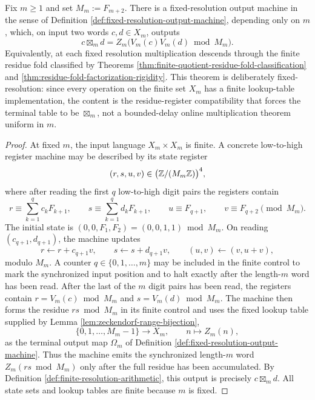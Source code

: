 \begin{theorem}\label{thm:finite-mul-fixed-resolution-fst}
Fix \(m\ge 1\) and set \(M_m:=F_{m+2}\). There is a fixed-resolution output machine in the sense of Definition \ref{def:fixed-resolution-output-machine}, depending only on \(m\), which, on input two words \(c,d\in X_m\), outputs
\[
c\boxtimes_m d=Z_m\bigl(V_m(c)V_m(d)\bmod M_m\bigr).
\]
Equivalently, at each fixed resolution multiplication descends through the finite residue fold classified by Theorems \ref{thm:finite-quotient-residue-fold-classification} and \ref{thm:residue-fold-factorization-rigidity}. This theorem is deliberately fixed-resolution: since every operation on the finite set \(X_m\) has a finite lookup-table implementation, the content is the residue-register compatibility that forces the terminal table to be \(\boxtimes_m\), not a bounded-delay online multiplication theorem uniform in \(m\).
\end{theorem}

\begin{proof}
At fixed \(m\), the input language \(X_m\times X_m\) is finite. A concrete low-to-high register machine may be described by its state register
\[
(r,s,u,v)\in \bigl(\mathbb{Z}/(M_m\mathbb{Z})\bigr)^4,
\]
where after reading the first \(q\) low-to-high digit pairs the registers contain
\[
r\equiv \sum_{k=1}^{q}c_kF_{k+1},
\qquad
s\equiv \sum_{k=1}^{q}d_kF_{k+1},
\qquad
u\equiv F_{q+1},
\qquad
v\equiv F_{q+2}
\pmod {M_m}.
\]
The initial state is \((0,0,F_1,F_2)=(0,0,1,1)\bmod M_m\). On reading \((c_{q+1},d_{q+1})\), the machine updates
\[
r\leftarrow r+c_{q+1}v,
\qquad
s\leftarrow s+d_{q+1}v,
\qquad
(u,v)\leftarrow(v,u+v),
\]
modulo \(M_m\). A counter \(q\in\{0,1,\dots,m\}\) may be included in the finite control to mark the synchronized input position and to halt exactly after the length-\(m\) word has been read. After the last of the \(m\) digit pairs has been read, the registers contain \(r=V_m(c)\bmod M_m\) and \(s=V_m(d)\bmod M_m\). The machine then forms the residue \(rs\bmod M_m\) in its finite control and uses the fixed lookup table supplied by Lemma \ref{lem:zeckendorf-range-bijection},
\[
\{0,1,\dots,M_m-1\}\longrightarrow X_m,
\qquad n\longmapsto Z_m(n),
\]
as the terminal output map \(\Omega_m\) of Definition \ref{def:fixed-resolution-output-machine}. Thus the machine emits the synchronized length-\(m\) word \(Z_m(rs\bmod M_m)\) only after the full residue has been accumulated. By Definition \ref{def:finite-resolution-arithmetic}, this output is precisely \(c\boxtimes_m d\). All state sets and lookup tables are finite because \(m\) is fixed.
\end{proof}

